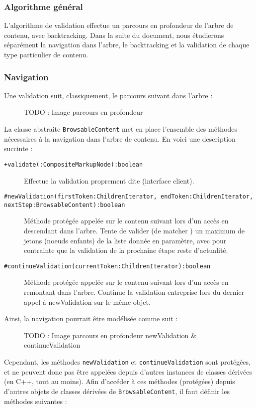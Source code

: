 \documentclass[12pt]{article}
\newcommand{\kw}[1]{\texttt{#1}}
\newcommand{\TODO}[1]{{\huge TODO : #1}}
\begin{document}
\subsubsection{Algorithme général}
L'algorithme de validation effectue un parcours en profondeur de l'arbre de contenu, avec backtracking. Dans la suite du document, nous étudierons séparément la navigation dans l'arbre, le backtracking et la validation de chaque type particulier de contenu.
\subsubsection{Navigation}
Une validation suit, classiquement, le parcours suivant dans l'arbre :
\begin{figure}
\caption{\TODO{Image parcours en profondeur}}
\end{figure}
La classe abstraite \kw{BrowsableContent} met en place l'ensemble des méthodes nécessaires à la navigation dans l'arbre de contenu.
En voici une description succinte :
\begin{description}
\item[\kw{+validate(:CompositeMarkupNode):boolean}] Effectue la validation proprement dite (interface client).
\item[\kw{\#newValidation(firstToken:ChildrenIterator, endToken:ChildrenIterator, nextStep:BrowsableContent):boolean}] Méthode protégée appelée sur le contenu suivant lors d'un accès en \og descendant \fg dans l'arbre. Tente de valider (de \og matcher \fg) un maximum de jetons (noeuds enfants) de la liste donnée en paramètre, avec pour contrainte que la validation de la prochaine étape reste d'actualité.
\item[\kw{\#continueValidation(currentToken:ChildrenIterator):boolean}] Méthode protégée appelée sur le contenu suivant lors d'un accès en \og remontant \fg dans l'arbre. Continue la validation entreprise lors du dernier appel à newValidation sur le même objet.
\end{description}
Ainsi, la navigation pourrait être modélisée comme suit :
\begin{figure}
\caption{\TODO{Image parcours en profondeur newValidation & continueValidation}}
\end{figure}
Cependant, les méthodes \kw{newValidation} et \kw{continueValidation} sont protégées, et ne peuvent donc pas être appelées depuis d'autres instances de classes dérivées (en C++, tout au moins). Afin d'accéder à ces méthodes (protégées) depuis d'autres objets de classes dérivées de \kw{BrowsableContent}, il faut définir les méthodes suivantes :
\end{document}
